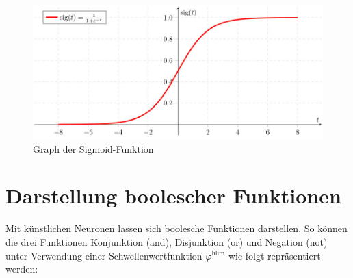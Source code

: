 \begin{figure}[h!]
\includegraphics[width=0.7\linewidth]{pics/Sigmoid}
\caption{Graph der Sigmoid-Funktion}
\label{fig:Sigmoid}
\end{figure}

\section{Darstellung boolescher Funktionen}
\MyHeadBottom



Mit künstlichen Neuronen lassen sich boolesche Funktionen darstellen. So können die drei Funktionen Konjunktion (and), Disjunktion (or) und Negation (not) unter Verwendung einer Schwellenwertfunktion ${\displaystyle \varphi ^{\mbox{hlim}}}$ wie folgt repräsentiert werden:\\

